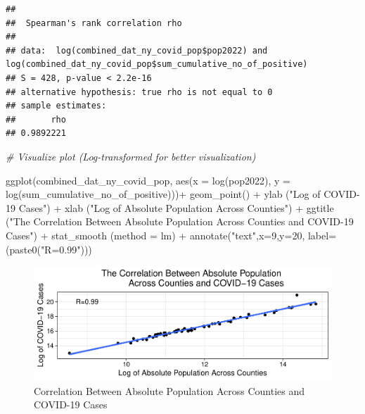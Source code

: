\documentclass[
  12pt,
]{article}
\newenvironment{Shaded}{\begin{snugshade}}{\end{snugshade}}
\newcommand{\AttributeTok}[1]{\textcolor[rgb]{0.77,0.63,0.00}{#1}}
\newcommand{\CommentTok}[1]{\textcolor[rgb]{0.56,0.35,0.01}{\textit{#1}}}
\newcommand{\DecValTok}[1]{\textcolor[rgb]{0.00,0.00,0.81}{#1}}
\newcommand{\FunctionTok}[1]{\textcolor[rgb]{0.00,0.00,0.00}{#1}}
\newcommand{\NormalTok}[1]{#1}
\newcommand{\SpecialCharTok}[1]{\textcolor[rgb]{0.00,0.00,0.00}{#1}}
\newcommand{\StringTok}[1]{\textcolor[rgb]{0.31,0.60,0.02}{#1}}
\begin{document}
\begin{verbatim}
## 
##  Spearman's rank correlation rho
## 
## data:  log(combined_dat_ny_covid_pop$pop2022) and log(combined_dat_ny_covid_pop$sum_cumulative_no_of_positive)
## S = 428, p-value < 2.2e-16
## alternative hypothesis: true rho is not equal to 0
## sample estimates:
##       rho 
## 0.9892221
\end{verbatim}

\begin{Shaded}
\begin{Highlighting}[]
\CommentTok{\# Visualize plot (Log{-}transformed for better visualization)}

\FunctionTok{ggplot}\NormalTok{(combined\_dat\_ny\_covid\_pop, }\FunctionTok{aes}\NormalTok{(}\AttributeTok{x =} \FunctionTok{log}\NormalTok{(pop2022), }\AttributeTok{y =} \FunctionTok{log}\NormalTok{(sum\_cumulative\_no\_of\_positive)))}\SpecialCharTok{+}
  \FunctionTok{geom\_point}\NormalTok{() }\SpecialCharTok{+}
  \FunctionTok{ylab}\NormalTok{ (}\StringTok{"Log of COVID{-}19 Cases"}\NormalTok{) }\SpecialCharTok{+}
  \FunctionTok{xlab}\NormalTok{ (}\StringTok{"Log of Absolute Population Across Counties"}\NormalTok{) }\SpecialCharTok{+}
  \FunctionTok{ggtitle}\NormalTok{ (}\StringTok{"The Correlation Between Absolute Population }
\StringTok{           Across Counties and COVID{-}19 Cases"}\NormalTok{) }\SpecialCharTok{+}
  \FunctionTok{stat\_smooth}\NormalTok{ (}\AttributeTok{method =} \StringTok{\textquotesingle{}lm\textquotesingle{}}\NormalTok{) }\SpecialCharTok{+}
  \FunctionTok{annotate}\NormalTok{(}\StringTok{"text"}\NormalTok{,}\AttributeTok{x=}\DecValTok{9}\NormalTok{,}\AttributeTok{y=}\DecValTok{20}\NormalTok{, }\AttributeTok{label=}\NormalTok{(}\FunctionTok{paste0}\NormalTok{(}\StringTok{"R=0.99"}\NormalTok{)))}
\end{Highlighting}
\end{Shaded}

\begin{figure}
\centering
\includegraphics{EDA_Final_Group_Project_files/figure-latex/unnamed-chunk-21-1.pdf}
\caption{Correlation Between Absolute Population Across Counties and
COVID-19 Cases}
\end{figure}
\end{document}
